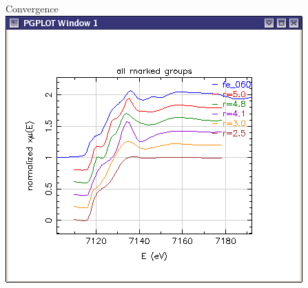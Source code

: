 \begin{frame}
\begin{columns}[T]
\begin{column}{0.62\linewidth}
      \bigskip

      \begin{block}{Convergence}
        \centering\includegraphics[width=0.7\linewidth]{images/xanes_convergence}
      \end{block}
    \end{column}
  \end{columns}
\end{frame}


